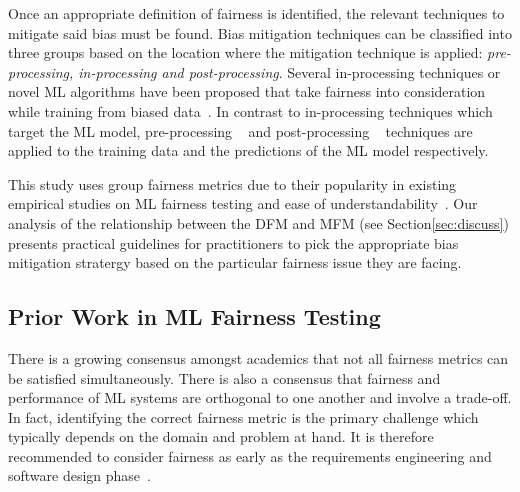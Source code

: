 \documentclass{article}
\begin{document}
Once an appropriate definition of fairness is identified, the relevant
techniques to mitigate said bias must be found. Bias mitigation
techniques can be classified into three groups based on the location
where the mitigation technique is applied: \emph{pre-processing,
in-processing and post-processing}. Several in-processing techniques
or novel ML algorithms have been proposed that take fairness into
consideration while training from biased
data \cite{zhang2018mitigating,agarwal2018reductions,kearns2018preventing,kamishima2012fairness}. In
contrast to in-processing techniques which target the ML model,
pre-processing
 \cite{feldman2015certifying,zemel2013learning,calmon2017optimized,kamiran2012data}
and post-processing
 \cite{pleiss2017fairness,hardt2016equality,kamiran2012decision}
techniques are applied to the training data and the predictions of the
ML model respectively.

This study uses group fairness metrics due to their popularity in
existing empirical studies on ML fairness testing and ease of
understandability \cite{zhang2021ignorance,biswas2020machine,biswas2021fair,hort2021fairea,chakraborty2021bias}. Our
analysis of the relationship between the DFM and MFM (see
Section\ref{sec:discuss}) presents practical guidelines for
practitioners to pick the appropriate bias mitigation stratergy based
on the particular fairness issue they are facing.

\subsection{Prior Work in ML Fairness Testing}\label{sec:prior-work}

There is a growing consensus amongst academics that not all fairness
metrics can be satisfied simultaneously. There is also a consensus
that fairness and performance of ML systems are orthogonal to one
another and involve a trade-off. In fact, identifying the correct
fairness metric is the primary challenge which typically depends on
the domain and problem at hand. It is therefore recommended to
consider fairness as early as the requirements engineering and
software design
phase \cite{zhang2020machine,chen2022fairness,mehrabi2021survey,zhang2021ignorance}.
\end{document}
